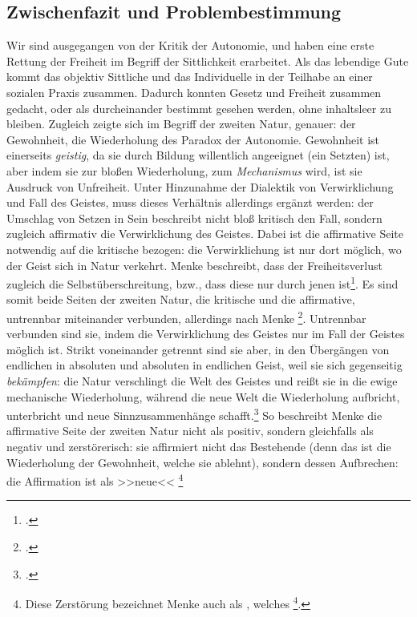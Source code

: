 \documentclass[12pt, a4paper, openany]{report}
\begin{document}
\subsection{Zwischenfazit und Problembestimmung}\label{zwisschenfazit}
Wir sind ausgegangen von der Kritik der Autonomie, und haben eine erste Rettung der Freiheit im Begriff der Sittlichkeit erarbeitet. 
Als das lebendige Gute kommt das objektiv Sittliche und das Individuelle in der Teilhabe an einer sozialen Praxis zusammen. 
Dadurch konnten Gesetz und Freiheit zusammen gedacht, oder als durcheinander bestimmt gesehen werden, ohne inhaltsleer zu bleiben.
Zugleich zeigte sich im Begriff der zweiten Natur, genauer: der Gewohnheit, die Wiederholung des Paradox der Autonomie.
Gewohnheit ist einerseits \emph{geistig}, da sie durch Bildung willentlich angeeignet (ein Setzten) ist, aber indem sie zur bloßen Wiederholung, zum \emph{Mechanismus} wird, ist sie  Ausdruck von Unfreiheit.
Unter Hinzunahme der Dialektik von Verwirklichung und Fall des Geistes, muss dieses Verhältnis allerdings ergänzt werden:
der Umschlag von Setzen in Sein beschreibt nicht bloß kritisch den Fall, sondern zugleich affirmativ die Verwirklichung des Geistes.
Dabei ist die affirmative Seite notwendig auf die kritische bezogen: 
die Verwirklichung ist nur dort möglich, wo der Geist sich in Natur verkehrt.
Menke beschreibt, dass der Freiheitsverlust zugleich die Selbstüberschreitung, bzw., dass diese nur durch jenen ist\footcite[Vgl.][145]{menke_autonomie_2018}.
Es sind somit beide Seiten der zweiten Natur, die kritische und die affirmative, untrennbar miteinander verbunden, allerdings nach Menke \footcite[][147]{menke_autonomie_2018}.
Untrennbar verbunden sind sie, indem die Verwirklichung des Geistes nur im Fall der Geistes möglich ist.
Strikt voneinander getrennt sind sie aber, in den Übergängen von endlichen in absoluten und absoluten in endlichen Geist, weil sie sich gegenseitig \emph{bekämpfen}:
die Natur verschlingt die Welt des Geistes und reißt sie in die ewige mechanische Wiederholung, während die neue Welt die Wiederholung aufbricht, unterbricht und neue Sinnzusammenhänge schafft.\footcite[Vgl.][147]{menke_autonomie_2018}
So beschreibt Menke die affirmative Seite der zweiten Natur nicht als positiv, sondern gleichfalls als negativ und zerstörerisch:
sie affirmiert nicht das Bestehende (denn das ist die Wiederholung der Gewohnheit, welche sie ablehnt), sondern dessen Aufbrechen: 
die Affirmation ist als >>neue<< %
\footnote{
    \cite[][S. 148. Hervorhebung von mir.]{menke_autonomie_2018}
    Diese Zerstörung bezeichnet Menke auch als , welches \footcite[][147]{menke_autonomie_2018}.
}%
\end{document}
